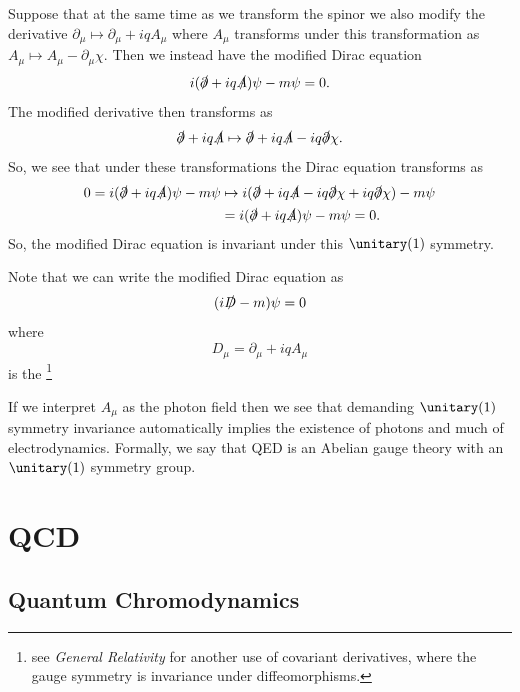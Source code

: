\documentclass[fleqn]{NotesClass}
\newcommand{\course}[1]{\textit{#1}}
\begin{document}
    Suppose that at the same time as we transform the spinor we also modify the derivative \(\partial_\mu \mapsto \partial_\mu + iq A_\mu\) where \(A_\mu\) transforms under this transformation as \(A_\mu \mapsto A_\mu - \partial_\mu \chi\).
    Then we instead have the modified Dirac equation
    \begin{equation}
        i(\slashed{\partial} + iq\slashed{A})\psi - m\psi = 0.
    \end{equation}
    The modified derivative then transforms as
    \begin{equation}
        \slashed{\partial} + iq\slashed{A} \mapsto \slashed{\partial} + iq\slashed{A} - iq\slashed{\partial}\chi.
    \end{equation}
    So, we see that under these transformations the Dirac equation transforms as
    \begin{align}
        0 = i(\slashed{\partial} + iq\slashed{A})\psi - m\psi &\mapsto i(\slashed{\partial} + iq\slashed{A} - iq\slashed{\partial}\chi + iq\slashed{\partial}\chi) - m\psi\\
        &= i(\slashed{\partial} + iq\slashed{A})\psi - m\psi = 0.
    \end{align}
    So, the modified Dirac equation is invariant under this \(\unitary(1)\) symmetry.
    
    Note that we can write the modified Dirac equation as
    \begin{equation}
        (i\slashed{D} - m)\psi = 0
    \end{equation}
    where
    \begin{equation}
        D_\mu = \partial_\mu + iqA_\mu
    \end{equation}
    is the \footnote{see \course{General Relativity} for another use of covariant derivatives, where the gauge symmetry is invariance under diffeomorphisms.}
    
    If we interpret \(A_\mu\) as the photon field then we see that demanding \(\unitary(1)\) symmetry invariance automatically implies the existence of photons and much of electrodynamics.
    Formally, we say that QED is an Abelian gauge theory with an \(\unitary(1)\) symmetry group.
    
    \part{QCD}    
    \chapter{Quantum Chromodynamics}
\end{document}
